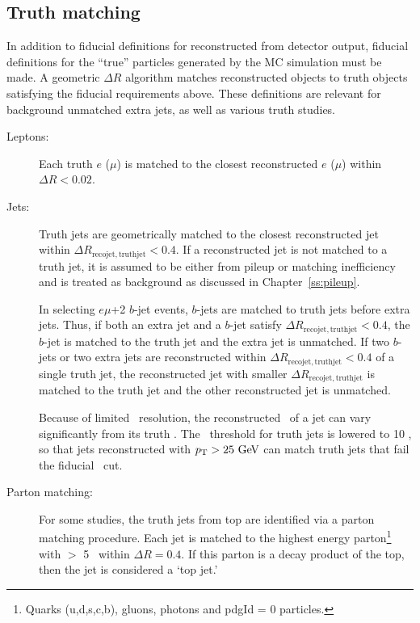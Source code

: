 \subsection{Truth matching}
In addition to fiducial definitions for reconstructed from detector output, fiducial definitions for the ``true'' particles generated by the MC simulation must be made.
\label{ss:tmatching}
A geometric $\Delta R$ algorithm matches reconstructed objects to truth objects satisfying the fiducial requirements above. These definitions are relevant for background unmatched extra jets, as well as various truth studies.
\begin{description}
\item[Leptons:] Each truth $e$ ($\mu$) is matched to the closest reconstructed $e$ ($\mu$) within $\Delta R < 0.02$.
\item[Jets:] Truth jets are geometrically matched to the closest reconstructed jet within $\Delta R_{\mathrm{reco jet, truth jet}} < 0.4$. If a reconstructed jet is not matched to a truth jet, it is assumed to be either from pileup or matching inefficiency and is treated as background as discussed in Chapter~\ref{ss:pileup}.

In selecting $e\mu$+2 $b$-jet events, $b$-jets are matched to truth jets before extra jets. Thus, if both an extra jet and a $b$-jet satisfy $\Delta R_{\mathrm{reco jet, truth jet}}<0.4$, the $b$-jet is matched to the truth jet and the extra jet is unmatched. If two $b$-jets or two extra jets are reconstructed within $\Delta R_{\mathrm{reco jet, truth jet}}<0.4$ of a single truth jet, the reconstructed jet with smaller $\Delta R_{\mathrm{reco jet, truth jet}}$ is matched to the truth jet and the other reconstructed jet is unmatched.

Because of limited \pt\ resolution, the reconstructed \pt\ of a jet can vary significantly from its truth \pt. The \pt\ threshold for truth jets is lowered to 10 \GeV, so that jets reconstructed with $\pt > 25 \GeV$ can match truth jets that fail the fiducial \pt\ cut. 



\item[Parton matching:] For some studies, the truth jets from top are identified via a parton matching procedure. Each jet is matched to the highest energy parton\footnote{Quarks (u,d,s,c,b), gluons, photons and pdgId = 0 particles.} with \pt $>$ 5 \GeV\ within $\Delta R = 0.4$. If this parton is a decay product of the top, then the jet is considered a `top jet.'
\end{description}
